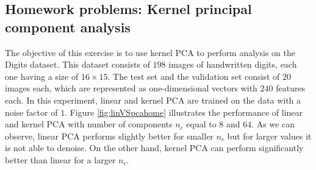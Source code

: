 \documentclass[a4paper, 11pt, one column]{article}
\begin{document}
\subsection{Homework problems: Kernel principal component analysis}
The objective of this exercise is to use kernel PCA to perform analysis on the Digits dataset. This dataset consists of $198$ images of handwritten digits, each one having a size of $16\times15$. The test set and the validation set consist of $20$ images each, which are represented as one-dimensional vectors with $240$ features each. In this experiment, linear and kernel PCA are trained on the data with a noise factor of $1$. Figure \ref{fig:linVSpcahome} illustrates the performance of linear and kernel PCA with number of components $n_c$ equal to $8$ and $64$. As we can observe, linear PCA performs slightly better for smaller $n_c$ but for larger values it is not able to denoise. On the other hand, kernel PCA can perform significantly better than linear for a larger $n_c$.
\end{document}
